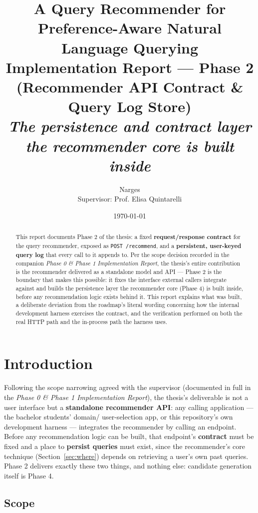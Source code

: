 \documentclass[11pt,a4paper]{article}
\title{\Large \textbf{A Query Recommender for Preference-Aware Natural Language Querying} \\[4pt]
\large Implementation Report --- Phase 2 (Recommender API Contract \& Query Log Store) \\[2pt]
\normalsize \emph{The persistence and contract layer the recommender core is built inside}}
\author{Narges \\ \small Supervisor: Prof. Elisa Quintarelli}
\date{\today}
\newcommand{\code}[1]{\texttt{#1}}
\begin{document}
\maketitle

\begin{abstract}
\noindent
This report documents Phase 2 of the thesis: a fixed \textbf{request/response contract} for the
query recommender, exposed as \code{POST /recommend}, and a \textbf{persistent, user-keyed query
log} that every call to it appends to. Per the scope decision recorded in the companion
\emph{Phase 0 \& Phase 1 Implementation Report}, the thesis's entire contribution is the
recommender delivered as a standalone model and API --- Phase 2 is the boundary that makes this
possible: it fixes the interface external callers integrate against and builds the persistence
layer the recommender core (Phase 4) is built inside, before any recommendation logic exists
behind it. This report explains what was built, a deliberate deviation from the roadmap's literal
wording concerning how the internal development harness exercises the contract, and the
verification performed on both the real HTTP path and the in-process path the harness uses.
\end{abstract}

\tableofcontents
\newpage

\section{Introduction}

Following the scope narrowing agreed with the supervisor (documented in full in the \emph{Phase 0
\& Phase 1 Implementation Report}), the thesis's deliverable is not a user interface but a
\textbf{standalone recommender API}: any calling application --- the bachelor students' domain/
user-selection app, or this repository's own development harness --- integrates the recommender
by calling an endpoint. Before any recommendation logic can be built, that endpoint's
\textbf{contract} must be fixed and a place to \textbf{persist queries} must exist, since the
recommender's core technique (Section~\ref{sec:where}) depends on retrieving a user's own past
queries. Phase 2 delivers exactly these two things, and nothing else: candidate generation itself
is Phase 4.

\subsection{Scope}
\end{document}
